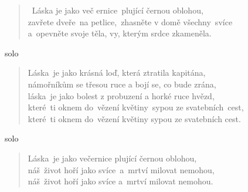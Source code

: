 \begin{song}{}
\begin{verse}
   ~Láska je jako več ernice~plující černou oblohou, \\
   zavřete dveře~na petlice,~zhasněte v domě všechny~svíce \\
   a~opevněte svoje těla, vy, kterým srdce zkameněla.
\end{verse}
  \begin{optional}{solo}
           
\end{optional}
\begin{verse}
   Láska~je jako krásná loď, která ztratila kapitána, \\
   námořníkům se třesou ruce a bojí se, co bude zrána, \\
   láska~je jako bolest z probuzení a horké ruce hvězd, \\
   které~ti oknem do~vězení květiny~sypou ze svatebních~cest, \\
   které~ti oknem do~vězení květiny sypou ze svatebních cest.
\end{verse}
\begin{optional}{solo}
           
\end{optional}
\begin{verse}
   Láska~je jako večernice plující černou oblohou, \\
   náš~život hoří jako svíce~a~mrtví milovat nemohou, \\
   náš~život hoří jako svíce a~mrtví milovat nemohou.
\end{verse}
  \begin{chords}
    \chordAmSix
  \end{chords}
\end{song}
\pagebreak
